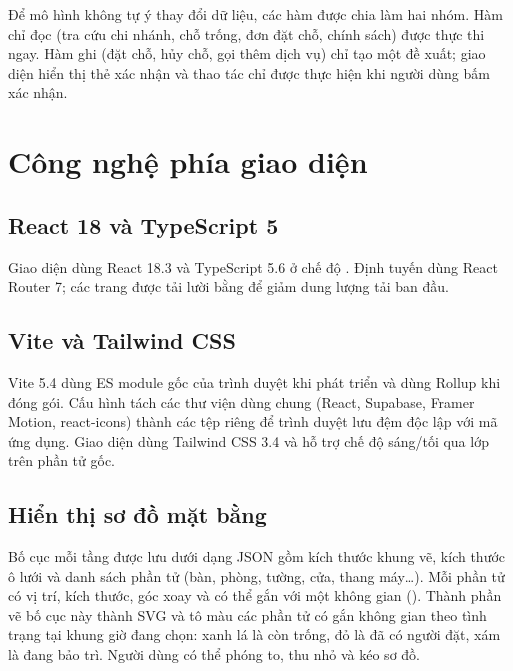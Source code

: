 Để mô hình không tự ý thay đổi dữ liệu, các hàm được chia làm hai nhóm. Hàm chỉ đọc (tra cứu chi nhánh, chỗ trống, đơn đặt chỗ, chính sách) được thực thi ngay. Hàm ghi (đặt chỗ, hủy chỗ, gọi thêm dịch vụ) chỉ tạo một đề xuất; giao diện hiển thị thẻ xác nhận và thao tác chỉ được thực hiện khi người dùng bấm xác nhận.

\section{Công nghệ phía giao diện}
\label{sec:cn_frontend}

\subsection{React 18 và TypeScript 5}
Giao diện dùng React 18.3 \cite{react_docs} và TypeScript 5.6 ở chế độ . Định tuyến dùng React Router 7; các trang được tải lười bằng  để giảm dung lượng tải ban đầu.

\subsection{Vite và Tailwind CSS}
Vite 5.4 \cite{vite_docs} dùng ES module gốc của trình duyệt khi phát triển và dùng Rollup khi đóng gói. Cấu hình  tách các thư viện dùng chung (React, Supabase, Framer Motion, react-icons) thành các tệp riêng để trình duyệt lưu đệm độc lập với mã ứng dụng. Giao diện dùng Tailwind CSS 3.4 \cite{tailwind_docs} và hỗ trợ chế độ sáng/tối qua lớp  trên phần tử gốc.

\subsection{Hiển thị sơ đồ mặt bằng}
Bố cục mỗi tầng được lưu dưới dạng JSON gồm kích thước khung vẽ, kích thước ô lưới và danh sách phần tử (bàn, phòng, tường, cửa, thang máy\ldots). Mỗi phần tử có vị trí, kích thước, góc xoay và có thể gắn với một không gian (). Thành phần  vẽ bố cục này thành SVG và tô màu các phần tử có gắn không gian theo tình trạng tại khung giờ đang chọn: xanh lá là còn trống, đỏ là đã có người đặt, xám là đang bảo trì. Người dùng có thể phóng to, thu nhỏ và kéo sơ đồ.

